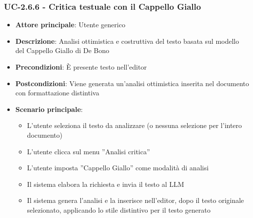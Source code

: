 \documentclass[11pt,a4paper]{article}
\begin{document}
\subsubsection{UC-2.6.6 - Critica testuale con il Cappello Giallo}
\begin{itemize}
    \item \textbf{Attore principale}: Utente generico
    \item \textbf{Descrizione}: Analisi ottimistica e costruttiva del testo basata sul modello del Cappello Giallo di De Bono
    \item \textbf{Precondizioni}: È presente testo nell’editor
    \item \textbf{Postcondizioni}: Viene generata un’analisi ottimistica inserita nel documento con formattazione distintiva
    \item \textbf{Scenario principale}:
    \begin{itemize}
        \item L’utente seleziona il testo da analizzare (o nessuna selezione per l'intero documento)
        \item L’utente clicca sul menu ”Analisi critica”
        \item L’utente imposta ”Cappello Giallo” come modalità di analisi
        \item Il sistema elabora la richiesta e invia il testo al LLM
        \item Il sistema genera l'analisi e la inserisce nell'editor, dopo il testo originale selezionato, applicando lo stile distintivo per il testo generato
    \end{itemize}
\end{itemize}
\end{document}
